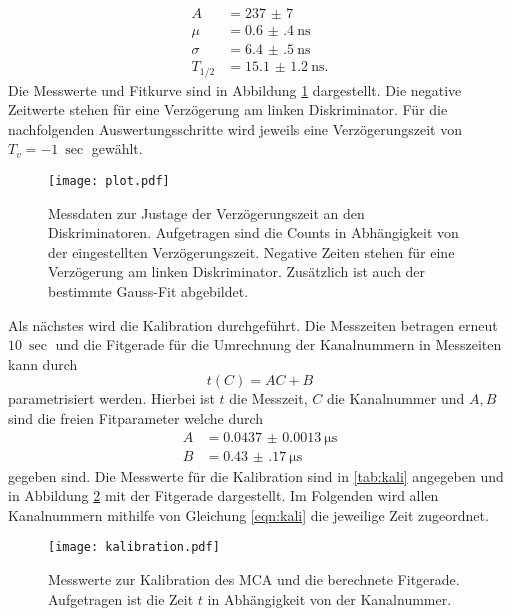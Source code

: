 \begin{align*}
    A &= \num{237(7)} \\
    \mu &= \SI{0.6(4)}{\nano\second} \\
    \sigma &= \SI{6.4(5)}{\nano\second} \\
    T_{1/2} &= \SI{15.1(12)}{\nano\second}.
\end{align*}
Die Messwerte und Fitkurve sind in Abbildung \ref{fig:Verzögerung} dargestellt. Die negative Zeitwerte stehen für eine Verzögerung am linken Diskriminator. 
Für die nachfolgenden Auswertungsschritte wird jeweils eine Verzögerungszeit von $T_v = \SI{-1}{\sec}$ gewählt.
\begin{figure}
    \centering
    \texttt{[image: plot.pdf]}
    \caption{Messdaten zur Justage der Verzögerungszeit an den Diskriminatoren. Aufgetragen sind die Counts in Abhängigkeit von der eingestellten Verzögerungszeit. Negative Zeiten stehen für eine Verzögerung am linken Diskriminator. Zusätzlich ist auch der bestimmte Gauss-Fit abgebildet.}
    \label{fig:Verzögerung}
\end{figure} 
Als nächstes wird die Kalibration durchgeführt. Die Messzeiten betragen erneut $\SI{10}{\sec}$ und die Fitgerade für die Umrechnung der Kanalnummern in Messzeiten kann durch 
\begin{equation}
    \label{eqn:kali}
    t(C) = AC + B
\end{equation}
parametrisiert werden. Hierbei ist $t$ die Messzeit, $C$ die Kanalnummer und $A,B$ sind die freien Fitparameter welche durch
\begin{align*}
    A &= \SI{0.0437(13)}{\micro\second} \\
    B &= \SI{0.43(17)}{\micro\second}
\end{align*}
gegeben sind. Die Messwerte für die Kalibration sind in \ref{tab:kali} angegeben und in Abbildung \ref{fig:kali} mit der Fitgerade dargestellt.
Im Folgenden wird allen Kanalnummern mithilfe von Gleichung \ref{eqn:kali} die jeweilige Zeit zugeordnet.
\begin{figure}
    \centering
    \texttt{[image: kalibration.pdf]}
    \caption{Messwerte zur Kalibration des MCA und die berechnete Fitgerade. Aufgetragen ist die Zeit $t$ in Abhängigkeit von der Kanalnummer.}
    \label{fig:kali}
\end{figure}
